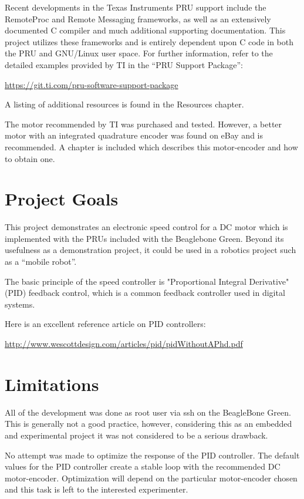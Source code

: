 Recent developments in the Texas Instruments PRU support include the RemoteProc and Remote Messaging frameworks, as well as an extensively documented C compiler and much additional supporting documentation.  This project utilizes these frameworks and is entirely dependent upon C code in both the PRU and GNU/Linux user space.  For further information, refer to the detailed examples provided by TI in the ``PRU Support Package'':

\url{https://git.ti.com/pru-software-support-package}

A listing of additional resources is found in the Resources chapter.

The motor recommended by TI was purchased and tested.  However, a better motor with an integrated quadrature encoder was found on eBay and is recommended.  A chapter is included which describes this motor-encoder and how to obtain one.

\section{Project Goals}

This project demonstrates an electronic speed control for a DC motor which is implemented with the PRUs included with the Beaglebone Green.  Beyond its usefulness as a demonstration project, it could be used in a robotics project such as a ``mobile robot''.

The basic principle of the speed controller is "Proportional Integral Derivative" (PID) feedback control, which is a common feedback controller used in digital systems.

Here is an excellent reference article on PID controllers:

\url{http://www.wescottdesign.com/articles/pid/pidWithoutAPhd.pdf}

\section{Limitations}

All of the development was done as root user via ssh on the BeagleBone Green.  This is generally not a good practice, however, considering this as an embedded and experimental project it was not considered to be a serious drawback.

No attempt was made to optimize the response of the PID controller.  The default values for the PID controller create a stable loop with the recommended DC motor-encoder.  Optimization will depend on the particular motor-encoder chosen and this task is left to the interested experimenter.


